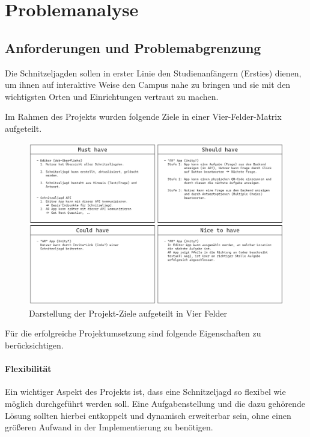 \chapter{Problemanalyse} \label{cha:problemanalyse}

\section{Anforderungen und Problemabgrenzung} \label{cha:problemanalyse:abgrenzung}

Die Schnitzeljagden sollen in erster Linie den Studienanfängern (Ersties) dienen, um ihnen auf interaktive Weise den Campus nahe zu bringen und sie mit den wichtigsten Orten und Einrichtungen vertraut zu machen.

Im Rahmen des Projekts wurden folgende Ziele in einer Vier-Felder-Matrix aufgeteilt.

\begin{figure}[H]
    \centering
    \includegraphics[width=\textwidth]{images/PrAr_ProblemAnalysis_Vierfelder.png}
    \caption{Darstellung der Projekt-Ziele aufgeteilt in Vier Felder}
    \label{fig:problemanalyse:vierfeldermatrixamarsch}
\end{figure}

Für die erfolgreiche Projektumsetzung sind folgende Eigenschaften zu berücksichtigen.

\subsubsection{Flexibilität}

Ein wichtiger Aspekt des Projekts ist, dass eine Schnitzeljagd so flexibel wie möglich durchgeführt werden soll. Eine Aufgabenstellung und die dazu gehörende Lösung sollten hierbei entkoppelt und dynamisch erweiterbar sein, ohne einen größeren Aufwand in der Implementierung zu benötigen.


